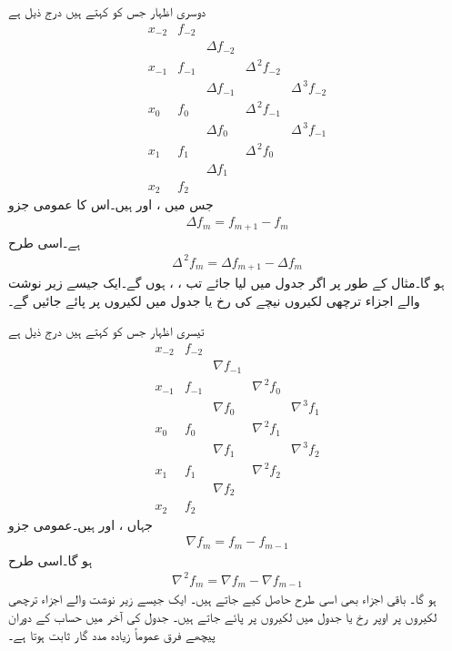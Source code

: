 دوسری اظہار جس کو  کہتے ہیں درج ذیل ہے
\begin{equation*}
\begin{array}{lllll}
x_{-2}&f_{-2}&&&\\
&&\Delta f_{-2}&&\\
x_{-1}&f_{-1}&&\Delta^{\,2} f_{-2}&\\
&&\Delta f_{-1}&&\Delta^{\,3} f_{-2}\\
x_0&f_0&&\Delta^{\,2} f_{-1}&\\
&&\Delta f_{0}&&\Delta^{\,3} f_{-1}\\
x_1&f_1&&\Delta^{\,2} f_{0}&\\
&&\Delta f_{1}&&\\
x_2&f_2&&&
\end{array}
\end{equation*}
جس میں ،   اور  ہیں۔اس کا عمومی جزو
\begin{align}
\Delta f_m=f_{m+1}-f_m
\end{align}
ہے۔اسی طرح
\begin{align*}
\Delta^{\,2}f_m=\Delta f_{m+1}-\Delta f_m
\end{align*}
ہو گا۔مثال کے طور پر اگر جدول  میں  لیا جائے تب ، ،
  ہوں گے۔ایک جیسے زیر نوشت والے اجزاء ترچھی لکیروں نیچے کی رخ یا جدول میں  لکیروں پر پائے جائیں گے۔ 

تیسری اظہار جس کو  کہتے ہیں درج ذیل ہے
\begin{equation*}
\begin{array}{lllll}
x_{-2}&f_{-2}&&&\\
&&\nabla f_{-1}&&\\
x_{-1}&f_{-1}&&\nabla^{\,2} f_{0}&\\
&&\nabla f_{0}&&\nabla^{\,3} f_{1}\\
x_0&f_0&&\nabla^{\,2} f_{1}&\\
&&\nabla f_{1}&&\nabla^{\,3} f_{2}\\
x_1&f_1&&\nabla^{\,2} f_{2}&\\
&&\nabla f_{2}&&\\
x_2&f_2&&&
\end{array}
\end{equation*}
جہاں ،  اور  ہیں۔عمومی جزو
\begin{align}
\nabla f_m=f_m-f_{m-1}
\end{align}
ہو گا۔اسی طرح 
\begin{align*}
\nabla^{\,2}f_m=\nabla f_m-\nabla f_{m-1}
\end{align*}
ہو گا۔ باقی اجزاء بھی اسی طرح حاصل کیے جاتے ہیں۔
ایک جیسے زیر نوشت والے اجزاء ترچھی لکیروں پر اوپر رخ یا جدول میں  لکیروں پر پائے جاتے ہیں۔ جدول کی آخر میں حساب کے دوران پیچھے فرق عموماً زیادہ مدد گار ثابت ہوتا ہے۔ 

